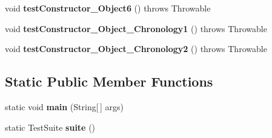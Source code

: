 \begin{DoxyCompactItemize}
\item 
\hypertarget{classorg_1_1joda_1_1time_1_1_test_mutable_interval___constructors_a4526f2c6badfbf363877b0fb3f36e277}{void {\bfseries test\-Constructor\-\_\-\-Object6} ()  throws Throwable }\label{classorg_1_1joda_1_1time_1_1_test_mutable_interval___constructors_a4526f2c6badfbf363877b0fb3f36e277}

\item 
\hypertarget{classorg_1_1joda_1_1time_1_1_test_mutable_interval___constructors_aeebf6b341d9aea4864801f0bcf1b427a}{void {\bfseries test\-Constructor\-\_\-\-Object\-\_\-\-Chronology1} ()  throws Throwable }\label{classorg_1_1joda_1_1time_1_1_test_mutable_interval___constructors_aeebf6b341d9aea4864801f0bcf1b427a}

\item 
\hypertarget{classorg_1_1joda_1_1time_1_1_test_mutable_interval___constructors_a280803cb04b5247be843738bc006fea3}{void {\bfseries test\-Constructor\-\_\-\-Object\-\_\-\-Chronology2} ()  throws Throwable }\label{classorg_1_1joda_1_1time_1_1_test_mutable_interval___constructors_a280803cb04b5247be843738bc006fea3}

\end{DoxyCompactItemize}
\subsection*{Static Public Member Functions}
\begin{DoxyCompactItemize}
\item 
\hypertarget{classorg_1_1joda_1_1time_1_1_test_mutable_interval___constructors_acb6f6ef0769b31ea8ae13463786580b9}{static void {\bfseries main} (String\mbox{[}$\,$\mbox{]} args)}\label{classorg_1_1joda_1_1time_1_1_test_mutable_interval___constructors_acb6f6ef0769b31ea8ae13463786580b9}

\item 
\hypertarget{classorg_1_1joda_1_1time_1_1_test_mutable_interval___constructors_a109516869dd3ef05c3213194a9c3d85e}{static Test\-Suite {\bfseries suite} ()}\label{classorg_1_1joda_1_1time_1_1_test_mutable_interval___constructors_a109516869dd3ef05c3213194a9c3d85e}

\end{DoxyCompactItemize}
